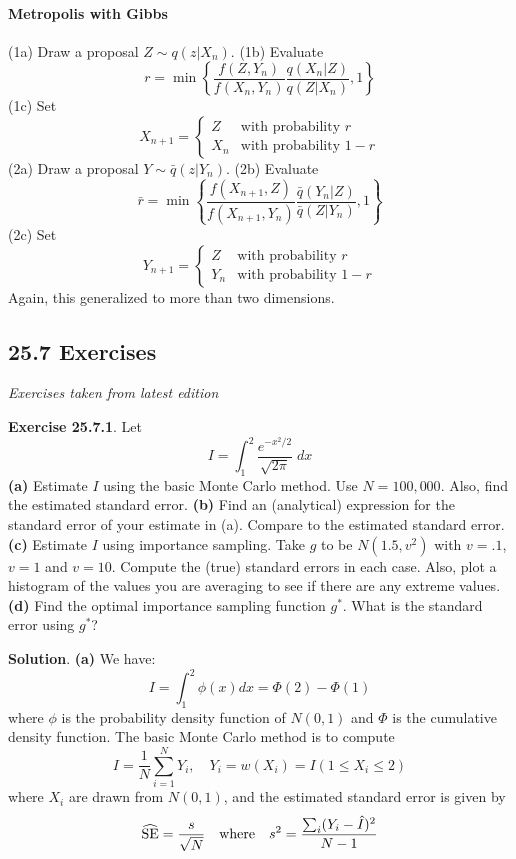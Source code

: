 \paragraph{Metropolis with Gibbs}\label{metropolis-with-gibbs}
(1a) Draw a proposal \(Z \sim q(z | X_{n})\).
(1b) Evaluate
\[
r = \min \left\{ \frac{f(Z, Y_{n})}{f(X_{n}, Y_{n})} \frac{q(X_{n} | Z)}{q(Z | X_{n})}, 1\right\}
\]
(1c) Set
\[
X_{n+1} = \begin{cases}
Z &\text{with probability } r \\
X_{n} &\text{with probability } 1 - r
\end{cases}
\]
(2a) Draw a proposal \(Y \sim \bar{q}(z | Y_{n})\).
(2b) Evaluate
\[
\bar{r} = \min \left\{ \frac{f(X_{n+1}, Z)}{f(X_{n+1}, Y_{n})} \frac{\bar{q}(Y_{n} | Z)}{\bar{q}(Z | Y_{n})}, 1 \right\}
\]
(2c) Set
\[
Y_{n+1} = \begin{cases}
Z &\text{with probability } r \\
Y_{n} &\text{with probability } 1 - r
\end{cases}
\]
Again, this generalized to more than two dimensions.

\subsection*{25.7 Exercises}
\emph{Exercises taken from latest edition}

\textbf{Exercise 25.7.1}. Let
\[
I = \int_{1}^{2} \frac{e^{-x^{2} / 2}}{\sqrt{2 \pi}} \; dx
\]
\textbf{(a)} Estimate \(I\) using the basic Monte Carlo method. Use
\(N = 100,000\). Also, find the estimated standard error.
\textbf{(b)} Find an (analytical) expression for the standard error of
your estimate in (a). Compare to the estimated standard error.
\textbf{(c)} Estimate \(I\) using importance sampling. Take \(g\) to be
\(N(1.5, v^{2})\) with \(v = .1\), \(v = 1\) and \(v = 10\). Compute the
(true) standard errors in each case. Also, plot a histogram of the
values you are averaging to see if there are any extreme values.
\textbf{(d)} Find the optimal importance sampling function \(g^{*}\). What
is the standard error using \(g^{*}\)?

\textbf{Solution}.
\textbf{(a)} We have:
\[
I = \int_{1}^{2} \phi(x) dx = \Phi(2) - \Phi(1)
\]
where \(\phi\) is the probability density function of \(N(0, 1)\) and
\(\Phi\) is the cumulative density function. The basic Monte Carlo
method is to compute
\[
I = \frac{1}{N} \sum_{i=1}^N Y_{i},
\quad Y_{i} = w(X_{i}) = I(1 \leq X_{i} \leq 2)
\]
where \(X_{i}\) are drawn from \(N(0, 1)\), and the estimated standard
error is given by
\[
\widehat{\operatorname{\mathrm{SE}}} = \frac{s}{\sqrt{N}} 
\quad \text{where} \quad
s^{2} = \frac{\sum_{i} (Y_{i} - \hat{I})^{2}}{N - 1}
\]

